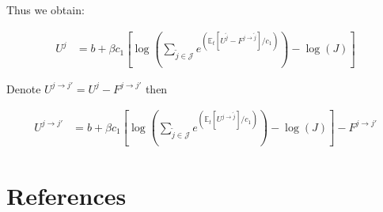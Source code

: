 \documentclass[
  letterpaper,
  DIV=11,
  numbers=noendperiod]{scrreprt}
\begin{document}
Thus we obtain:

\begin{align*}
U^{j} &= b + \beta c_1\left[
\log{\left(\sum_{\tilde{j}\in \mathcal{J}}e^{\left(\mathbb{E}_t\left[U^{\tilde{j}} - F^{j \to \tilde{j}}\right] /c_1\right)}\right)} - \log{\left(J\right)} \right]
\end{align*}

Denote \(U^{j \to j'} = U^{j} - F^{j \to j'}\) then

\begin{align*}
U^{j \to j' } &= b + \beta c_1\left[
\log{\left(\sum_{\tilde{j}\in \mathcal{J}}e^{\left(\mathbb{E}_t\left[U^{j \to \tilde{j}}\right] /c_1\right)}\right)} - \log{\left(J\right)} \right] - F^{j \to j'}
\end{align*}

\hypertarget{bibliography}{%
\chapter*{References}\label{bibliography}}
\end{document}
